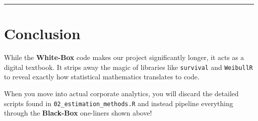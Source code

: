\documentclass[
]{article}
\begin{document}
\begin{center}\rule{0.5\linewidth}{0.5pt}\end{center}

\section{Conclusion}\label{conclusion}

While the \textbf{White-Box} code makes our project significantly
longer, it acts as a digital textbook. It strips away the magic of
libraries like \texttt{survival} and \texttt{WeibullR} to reveal exactly
how statistical mathematics translates to code.

When you move into actual corporate analytics, you will discard the
detailed scripts found in \texttt{02\_estimation\_methods.R} and instead
pipeline everything through the \textbf{Black-Box} one-liners shown
above!
\end{document}
